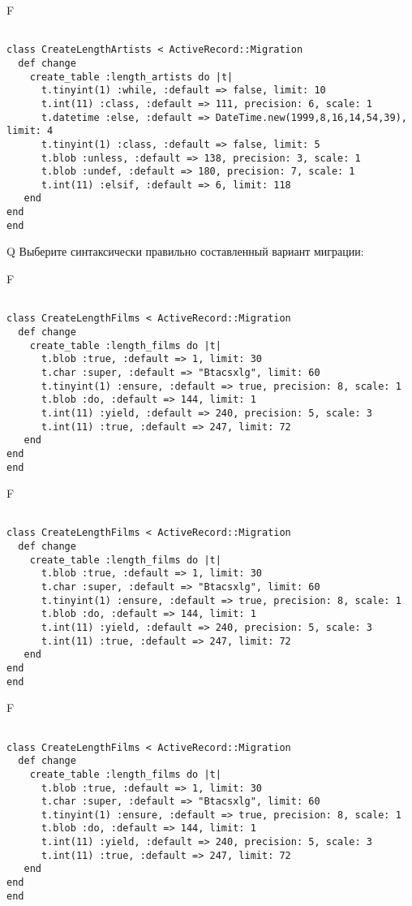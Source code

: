 F
\begin{verbatim}
		
class CreateLengthArtists < ActiveRecord::Migration 
  def change 
    create_table :length_artists do |t| 
      t.tinyint(1) :while, :default => false, limit: 10
      t.int(11) :class, :default => 111, precision: 6, scale: 1
      t.datetime :else, :default => DateTime.new(1999,8,16,14,54,39), limit: 4
      t.tinyint(1) :class, :default => false, limit: 5
      t.blob :unless, :default => 138, precision: 3, scale: 1
      t.blob :undef, :default => 180, precision: 7, scale: 1
      t.int(11) :elsif, :default => 6, limit: 118
   end
end
end
\end{verbatim}

Q
Выберите синтаксически правильно составленный вариант миграции:

F
\begin{verbatim}
		
class CreateLengthFilms < ActiveRecord::Migration 
  def change 
    create_table :length_films do |t| 
      t.blob :true, :default => 1, limit: 30
      t.char :super, :default => "Btacsxlg", limit: 60
      t.tinyint(1) :ensure, :default => true, precision: 8, scale: 1
      t.blob :do, :default => 144, limit: 1
      t.int(11) :yield, :default => 240, precision: 5, scale: 3
      t.int(11) :true, :default => 247, limit: 72
   end
end
end
\end{verbatim}

F
\begin{verbatim}
		
class CreateLengthFilms < ActiveRecord::Migration 
  def change 
    create_table :length_films do |t| 
      t.blob :true, :default => 1, limit: 30
      t.char :super, :default => "Btacsxlg", limit: 60
      t.tinyint(1) :ensure, :default => true, precision: 8, scale: 1
      t.blob :do, :default => 144, limit: 1
      t.int(11) :yield, :default => 240, precision: 5, scale: 3
      t.int(11) :true, :default => 247, limit: 72
   end
end
end
\end{verbatim}

F
\begin{verbatim}
		
class CreateLengthFilms < ActiveRecord::Migration 
  def change 
    create_table :length_films do |t| 
      t.blob :true, :default => 1, limit: 30
      t.char :super, :default => "Btacsxlg", limit: 60
      t.tinyint(1) :ensure, :default => true, precision: 8, scale: 1
      t.blob :do, :default => 144, limit: 1
      t.int(11) :yield, :default => 240, precision: 5, scale: 3
      t.int(11) :true, :default => 247, limit: 72
   end
end
end
\end{verbatim}

